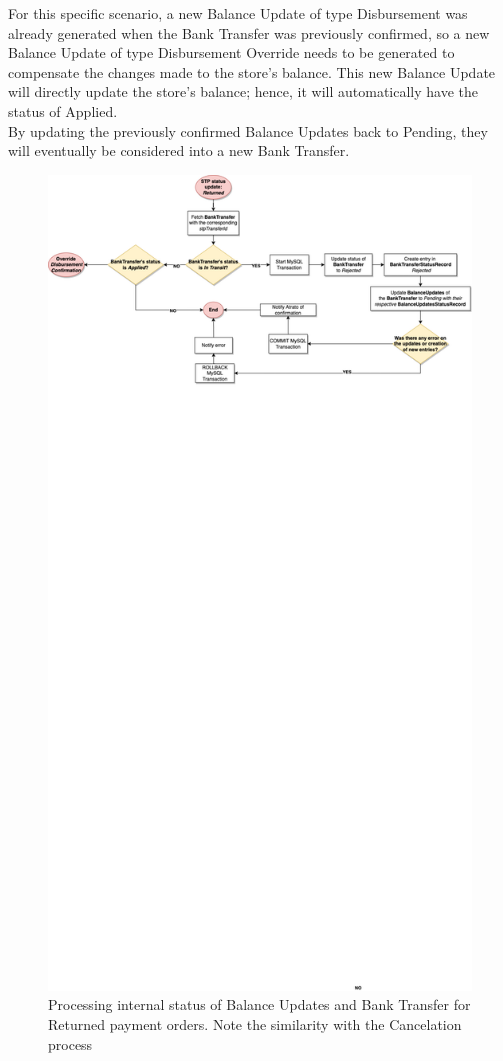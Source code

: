 For this specific scenario, a new Balance Update of type Disbursement was already generated when the Bank Transfer was previously confirmed, so a new Balance Update of type Disbursement Override needs to be generated to compensate the changes made to the store’s balance. This new Balance Update will directly update the store’s balance; hence, it will automatically have the status of Applied.\\

By updating the previously confirmed Balance Updates back to Pending, they will eventually be considered into a new Bank Transfer.

\begin{figure} [h]
    \centering
    \includegraphics[scale = 0.4]{assets/diagrams/ReturnedStatusUpdate.png}
    \caption{Processing internal status of Balance Updates and Bank Transfer for Returned payment orders. Note the similarity with the Cancelation process}\label{fig:returned_status_update}
\end{figure}

